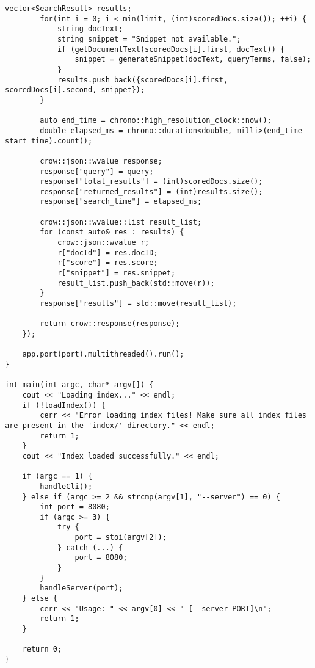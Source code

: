 \documentclass{article}
\begin{document}
\begin{lstlisting}[caption={The complete source code for the query processor component.}, label={lst:query}]
        vector<SearchResult> results;
        for(int i = 0; i < min(limit, (int)scoredDocs.size()); ++i) {
            string docText;
            string snippet = "Snippet not available.";
            if (getDocumentText(scoredDocs[i].first, docText)) {
                snippet = generateSnippet(docText, queryTerms, false);
            }
            results.push_back({scoredDocs[i].first, scoredDocs[i].second, snippet});
        }
        
        auto end_time = chrono::high_resolution_clock::now();
        double elapsed_ms = chrono::duration<double, milli>(end_time - start_time).count();
        
        crow::json::wvalue response;
        response["query"] = query;
        response["total_results"] = (int)scoredDocs.size();
        response["returned_results"] = (int)results.size();
        response["search_time"] = elapsed_ms;
        
        crow::json::wvalue::list result_list;
        for (const auto& res : results) {
            crow::json::wvalue r;
            r["docId"] = res.docID;
            r["score"] = res.score;
            r["snippet"] = res.snippet;
            result_list.push_back(std::move(r));
        }
        response["results"] = std::move(result_list);
        
        return crow::response(response);
    });
    
    app.port(port).multithreaded().run();
}

int main(int argc, char* argv[]) {
    cout << "Loading index..." << endl;
    if (!loadIndex()) {
        cerr << "Error loading index files! Make sure all index files are present in the 'index/' directory." << endl;
        return 1;
    }
    cout << "Index loaded successfully." << endl;
    
    if (argc == 1) {
        handleCli(); 
    } else if (argc >= 2 && strcmp(argv[1], "--server") == 0) {
        int port = 8080; 
        if (argc >= 3) {
            try {
                port = stoi(argv[2]);
            } catch (...) {
                port = 8080;
            }
        }
        handleServer(port);
    } else {
        cerr << "Usage: " << argv[0] << " [--server PORT]\n";
        return 1;
    }
    
    return 0;
}
\end{lstlisting}
\end{document}
